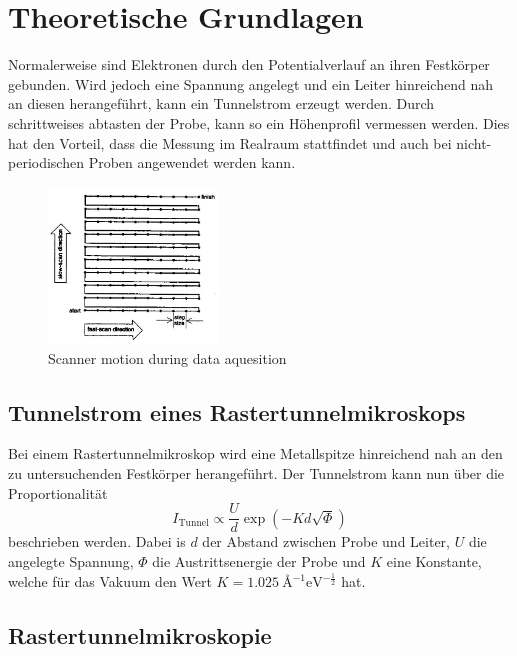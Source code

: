 \section{Theoretische Grundlagen}
\label{sec:theoretische_grundlagen}

Normalerweise sind Elektronen durch den Potentialverlauf an ihren Festkörper gebunden.
Wird jedoch eine Spannung angelegt und ein Leiter hinreichend nah an diesen herangeführt, kann ein Tunnelstrom erzeugt werden.
Durch schrittweises abtasten der Probe, kann so ein Höhenprofil vermessen werden.
Dies hat den Vorteil, dass die Messung im Realraum stattfindet und auch bei nicht-periodischen Proben angewendet werden kann.
\begin{figure}[!h]
    \centering
    \includegraphics[width=0.4\textwidth]{images/scanning.jpg}
    \caption{Scanner motion during data aquesition \cite{STM-Literatur}}
\end{figure}

\subsection{Tunnelstrom eines Rastertunnelmikroskops} %
\label{sub:tunnelstrom}

Bei einem Rastertunnelmikroskop wird eine Metallspitze hinreichend nah an den zu untersuchenden Festkörper herangeführt.
Der Tunnelstrom kann nun über die Proportionalität
\begin{equation}
    I_\text{Tunnel} \propto \frac{U}{d} \exp{\left( - K d \sqrt{\Phi} \right)} \label{eqn:tunnelstrom}
\end{equation}
beschrieben werden.
Dabei is $d$ der Abstand zwischen Probe und Leiter, $U$ die angelegte Spannung, $\Phi$ die Austrittsenergie der Probe und $K$ eine Konstante, welche für das Vakuum den Wert $K = \SI{1,025}{\angstrom^{-1} \electronvolt^{-\frac{1}{2}}}$ hat.

\subsection{Rastertunnelmikroskopie} %
\label{sub:rastertunnelmikroskopie}

